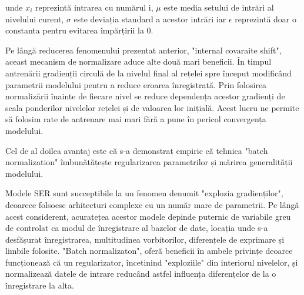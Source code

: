 \documentclass[a4paper,12pt]{book}
\begin{document}
				\quad unde $x_i$ reprezintă intrarea cu numărul i, $\mu$ este media setului de intrări al nivelului curent, $\sigma$ este deviația standard a acestor intrări iar $\epsilon$ reprezintă doar o constanta pentru evitarea împărțirii la 0.
				
				Pe lângă reducerea fenomenului prezentat anterior, "internal covaraite shift", aceast mecanism de normalizare aduce alte două mari beneficii. În timpul antrenării gradienții circulă de la nivelul final al rețelei spre început modificând parametrii modelului pentru a reduce eroarea înregistrată.
				Prin folosirea normalizării înainte de fiecare nivel se reduce dependența acestor gradienți de scala ponderilor nivelelor rețelei și de valoarea lor inițială. Acest lucru ne permite să folosim rate de antrenare mai mari fără a pune în pericol convergența modelului. \par
				Cel de al doilea avantaj este că s-a demonstrat empiric \cite{batch_norm} că tehnica "batch normalization" îmbunătățește regularizarea parametrilor și mărirea generalității modelului. \par
				Modele SER sunt succeptibile la un fenomen denumit "explozia gradienților", deoarece folsoesc arhitecturi complexe cu un număr mare de parametrii. Pe lângă acest considerent, acuratețea acestor modele depinde puternic de variabile greu de controlat ca modul de înregistrare al bazelor de date, locația unde s-a desfășurat înregistrarea, multitudinea vorbitorilor, diferențele de exprimare și limbile folosite. "Batch normalizaton", oferă beneficii în ambele privințe deoarce funcționează că un regularizator, încetinind "exploziile" din interiorul nivelelor, și normalizează datele de intrare reducând astfel influența diferențelor de la o înregistrare la alta. \par
\end{document}
